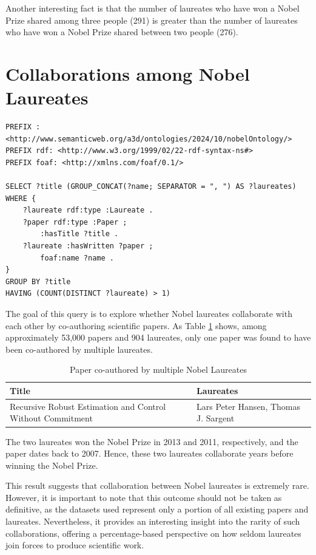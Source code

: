 \documentclass{article}
\begin{document}
Another interesting fact is that the number of laureates who have won a Nobel Prize shared among three people (291)
is greater than the number of laureates who have won a Nobel Prize shared between two people (276).

\newpage

\section{Collaborations among Nobel Laureates}

\begin{lstlisting}
PREFIX : <http://www.semanticweb.org/a3d/ontologies/2024/10/nobelOntology/>
PREFIX rdf: <http://www.w3.org/1999/02/22-rdf-syntax-ns#>
PREFIX foaf: <http://xmlns.com/foaf/0.1/>

SELECT ?title (GROUP_CONCAT(?name; SEPARATOR = ", ") AS ?laureates) WHERE {
    ?laureate rdf:type :Laureate .
    ?paper rdf:type :Paper ;
        :hasTitle ?title .
    ?laureate :hasWritten ?paper ;
        foaf:name ?name .
}
GROUP BY ?title
HAVING (COUNT(DISTINCT ?laureate) > 1)
\end{lstlisting}

\vspace{1em}

The goal of this query is to explore whether Nobel laureates collaborate with each other by co-authoring
scientific papers. As Table \ref{tab:laureates_collaboration} shows, among approximately 53,000 papers
and 904 laureates, only one paper was found to have been co-authored by multiple laureates.

\begin{table}[H]
	\caption{Paper co-authored by multiple Nobel Laureates}
	\centering
	\begin{tabular}{|l|l|}
		\hline
		\textbf{Title}                                             & \textbf{Laureates}                   \\ \hline
		Recursive Robust Estimation and Control Without Commitment & Lars Peter Hansen, Thomas J. Sargent \\ \hline
	\end{tabular}
	\label{tab:laureates_collaboration}
\end{table}

The two laureates won the Nobel Prize in 2013 and 2011, respectively, and the paper dates back to 2007.
Hence, these two laureates collaborate years before winning the Nobel Prize.

This result suggests that collaboration between Nobel laureates is extremely rare. However, it is important to
note that this outcome should not be taken as definitive, as the datasets used represent only a portion of all
existing papers and laureates. Nevertheless, it provides an interesting insight into the rarity of such
collaborations, offering a percentage-based perspective on how seldom laureates join forces to produce scientific
work.
\end{document}
